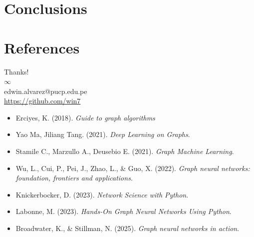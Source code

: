 \documentclass[aspectratio=169]{beamer}
\begin{document}
\section{Conclusions}

\section*{References}
    \begin{frame}
        \begin{center}
            {\Huge\calligra Thanks!} \\
            {\Huge $\infty$} \\
            edwin.alvarez@pucp.edu.pe \\
            \url{https://github.com/win7}
        \end{center}
    \end{frame}
    
    \begin{frame}[allowframebreaks]
        \footnotesize %
        
        \begin{itemize}
            \item Erciyes, K. (2018). \textit{Guide to graph algorithms} %
            \item Yao Ma, Jiliang Tang. (2021). \textit{Deep Learning on Graphs}.
            \item Stamile C., Marzullo A., Deusebio E. (2021). \textit{Graph Machine Learning}.
            \item Wu, L., Cui, P., Pei, J., Zhao, L., \& Guo, X. (2022). \textit{Graph neural networks: foundation, frontiers and applications}. %
            \item Knickerbocker, D. (2023). \textit{Network Science with Python}. %
            \item Labonne, M. (2023). \textit{Hands-On Graph Neural Networks Using Python}.
            \item Broadwater, K., \& Stillman, N. (2025). \textit{Graph neural networks in action}. %
        \end{itemize}
    \end{frame}
\end{document}
